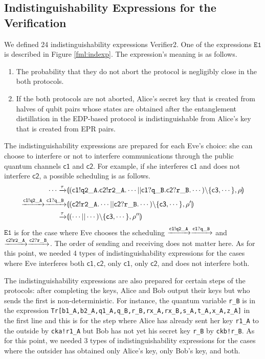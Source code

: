 \subsection{Indistinguishability Expressions for the Verification}
We defined 24 indistinguishability expressions Verifier2.
One of the expressions $\mathtt{E1}$ is described in Figure 
\ref{fml:indexp}. The expression's meaning is as follows.
\begin{enumerate}
 \item The probability that they do not abort the protocol is negligibly
       close in the both protocols.
 \item If the both protocols are not aborted,
       Alice's secret key that is created from halves of qubit pairs
       whose states
       are obtained after the entanglement distillation in the EDP-based
       protocol is indistinguishable from Alice's key that is
       created from EPR pairs.
\end{enumerate}
The indistinguishability expressions are prepared for each Eve's choice: she
can choose to interfere or not to interfere communications through
the public quantum channels $\mathsf{c1}$ and $\mathsf{c2}$.
For example, if she interferes $\mathsf{c1}$ and does not interfere
$\mathsf{c2}$, a possible scheduling is as follows.
\begin{align*}
 \cdots \xrightarrow{\tau} &
 \llparenthesis (\mathsf{c1}! \mathtt{q2\_A}.\mathsf{c2}! \mathtt{r2\_A}.\cdots||
 \mathsf{c1}? \mathtt{q\_B}.\mathsf{c2}? \mathtt{r\_B}.\cdots)\backslash 
 \{\mathsf{c3},\cdots\}, \rho \rrparenthesis\\
 \xrightarrow{\mathsf{c1}! \mathtt{q2\_A}} 
 \xrightarrow{\mathsf{c1}? \mathtt{q\_B}} &
 \llparenthesis (\mathsf{c2}! \mathtt{r2\_A}.\cdots||
 \mathsf{c2}? \mathtt{r\_B}.\cdots)\backslash
 \{\mathsf{c3},\cdots\}, \rho' \rrparenthesis\\
 \xrightarrow{\tau} &
 \llparenthesis (\cdots||
 \cdots)\backslash
 \{\mathsf{c3},\cdots\}, \rho'' \rrparenthesis
\end{align*}
$\mathtt{E1}$ is for the case where Eve chooses the scheduling
$\xrightarrow{\mathsf{c1}! \mathtt{q2\_A}}
\xrightarrow{\mathsf{c1}? \mathtt{q\_B}}$ and\\
$\xrightarrow{\mathsf{c2}! \mathtt{r2\_A}}
\xrightarrow{\mathsf{c2}? \mathtt{r\_B}}$. The order of sending and
receiving does not matter here.
 As for this point, we needed 4 types of indistinguishability expressions
for the cases where Eve interferes both $\mathsf{c1}, \mathsf{c2}$,
only $\mathsf{c1}$, only $\mathsf{c2}$, and does not interfere both.

The indistinguishability expressions are also prepared for certain
steps of the protocols: after completing the keys, Alice and Bob output
their keys but who sends the first is non-deterministic.
For instance, the quantum variable {\tt r\_B} is in the expression
{\tt Tr[b1\_A,b2\_A,q1\_A,q\_B,r\_B,rx\_A,rx\_B,s\_A,t\_A,x\_A,z\_A]} in
the first
line and this is for the step where Alice has already 
sent her key {\tt r1\_A} to the outside by {\tt cka!r1\_A}
but Bob has not yet his secret
key {\tt r\_B} by {\tt ckb!r\_B}. As for this point,
we needed 3 types of indistinguishability expressions
for the cases where the outsider has obtained only Alice's key, 
only Bob's key, and both.

